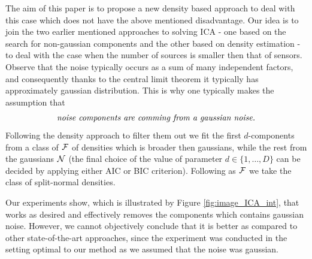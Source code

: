 The aim of this paper is to propose a new density based approach to deal with this case which does not have the above
mentioned disadvantage. Our idea is to join the two earlier mentioned approaches to solving ICA - one based on the search for non-gaussian components and the
other based on density estimation - to deal with the case when the number of sources is smaller then that of sensors.  
Observe that the noise typically occurs as a sum of many independent
factors, and consequently thanks to the central limit theorem it typically has approximately gaussian distribution. This is why
one typically makes the assumption \cite{cover2012elements} that
$$
\text{\em noise components are comming from a gaussian noise.}
$$ 
Following the density approach to filter them out we fit the first $d$-components from a class of $\mathcal{F}$ of densities which is broader then gaussians, while the rest from the gaussians $\mathcal{N}$ (the final choice of the value of parameter $d \in \{1,\ldots,D\}$ can be decided by applying either AIC or BIC criterion). Following \cite{ICA2017pattern} as $\mathcal{F}$ we take the class \SN{} of split-normal densities.

Our experiments show, which is illustrated by Figure \ref{fig:image_ICA_int}, that \ICA{} works as desired and effectively removes the components which contains gaussian noise. However, we cannot objectively conclude that it is better as compared to other state-of-the-art approaches, since the experiment 
was conducted in the setting optimal to our method as we assumed
that the noise was gaussian.
